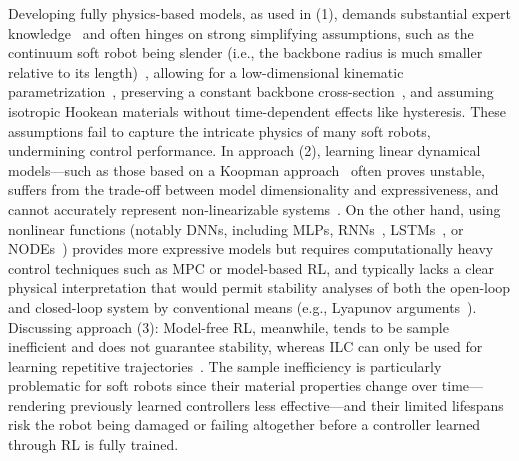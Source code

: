 Developing fully physics-based models, as used in (1), demands substantial expert knowledge~\cite{stella2023science} and often hinges on strong simplifying assumptions, such as the continuum soft robot being slender (i.e., the backbone radius is much smaller relative to its length)~\cite{cosserat1909theorie}, allowing for a low-dimensional kinematic parametrization~\cite{armanini2023soft}, preserving a constant backbone cross-section~\cite{gazzola2018forward}, and assuming isotropic Hookean materials without time-dependent effects like hysteresis. These assumptions fail to capture the intricate physics of many soft robots, undermining control performance. In approach (2), learning linear dynamical models—such as those based on a Koopman approach~\cite{bruder2020data, bruder2024koopman} often proves unstable, suffers from the trade-off between model dimensionality and expressiveness, and cannot accurately represent non-linearizable systems~\cite{cenedese2022data}. On the other hand, using nonlinear functions (notably \glspl{DNN}, including \glspl{MLP}, \glspl{RNN}~\cite{thuruthel2018model, sun2022physics}, \glspl{LSTM}~\cite{xie2023dynamic}, or \glspl{NODE}~\cite{kasaei2023data}) provides more expressive models but requires computationally heavy control techniques such as \gls{MPC} or model-based \gls{RL}, and typically lacks a clear physical interpretation that would permit stability analyses of both the open-loop and closed-loop system by conventional means (e.g., Lyapunov arguments~\cite{khalil2002nonlinear}). Discussing approach (3): Model-free \gls{RL}, meanwhile, tends to be sample inefficient and does not guarantee stability, whereas \gls{ILC} can only be used for learning repetitive trajectories~\cite{bristow2006survey}. The sample inefficiency is particularly problematic for soft robots since their material properties change over time—rendering previously learned controllers less effective—and their limited lifespans~\cite{yasa2023overview} risk the robot being damaged or failing altogether before a controller learned through \gls{RL} is fully trained.

